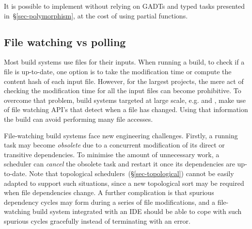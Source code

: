 \noindent
It is possible to implement  without relying on GADTs and typed
tasks presented in~\S\ref{sec-polymorphism}, at the cost of using partial
functions.

\subsection{File watching vs polling}\label{sec-integration-with-ides}

Most build systems use files for their inputs. When running a build, to check if
a file is up-to-date, one option is to take the modification time or compute the
content hash of each input file. However, for the largest projects, the mere act
of checking the modification time for all the input files can become
prohibitive. To overcome that problem, build systems targeted at large scale,
e.g. \Bazel and \Buck, make use of file watching API's that detect when a file
has changed. Using that information the build can avoid performing many file
accesses.

File-watching build systems face new engineering challenges. Firstly, a running
task may become \emph{obsolete} due to a concurrent modification of its direct
or transitive dependencies. To minimise the amount of unnecessary work, a
scheduler can \emph{cancel} the obsolete task and restart it once its
dependencies are up-to-date. Note that topological
schedulers~(\S\ref{sec-topological}) cannot be easily adapted to support such
situations, since a new topological sort may be required when file dependencies
change. A further complication is that spurious dependency cycles may form
during a series of file modifications, and a file-watching build system
integrated with an IDE should be able to cope with such spurious cycles
gracefully instead of terminating with an error.

